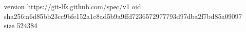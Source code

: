 version https://git-lfs.github.com/spec/v1
oid sha256:a6d85bb23cc9bfe152a1c8ad5b9a9ffd7236572977793d97dba2f7bd85a09097
size 524384
